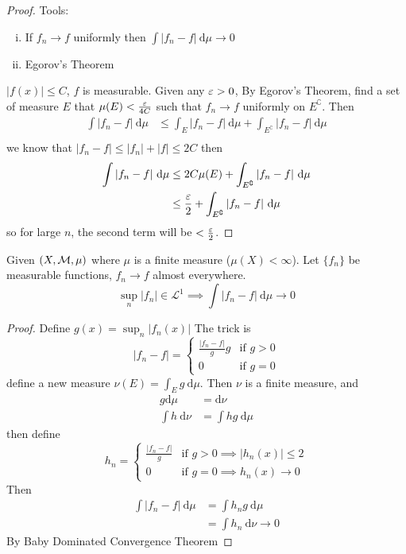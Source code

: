 \begin{proof}
  Tools:
  \begin{enumerate}[(i)]
    \item If $f_n \to f$ uniformly then $\int |f_n-f| \ \mathrm{d}\mu \to 0$
    \item Egorov's Theorem
  \end{enumerate}
  $|f(x)| \le C$, $f$ is measurable.
  Given any $\varepsilon > 0$, By Egorov's Theorem, find a set of measure $E$ that $\mu(E) < \frac{\varepsilon}{4C}$ 
  such that $f_n \to f$ uniformly on $E^\complement$.
  Then
  \begin{align*}
    \int |f_n - f| \ \mathrm{d}\mu &\le \int_E |f_n - f| \ \mathrm{d}\mu + \int_{E^\complement} |f_n - f| \ \mathrm{d}\mu  \\
  \end{align*}
  we know that $|f_n - f| \le |f_n| + |f| \le 2C$ then
  \begin{align*}
    \int |f_n - f| \ \mathrm{d}\mu &\le 2C\mu(E) + \int_{E^\complement} |f_n - f| \ \mathrm{d}\mu  \\
    &\le \frac{\eps}{2} + \int_{E^\complement} |f_n - f| \ \mathrm{d}\mu  \\ 
  \end{align*}
  so for large $n$, the second term will be $< \frac{\varepsilon}{2}$.
\end{proof}

\begin{theorem}
  Given $(X, \mathcal M, \mu)$ where $\mu$ is a finite measure ($\mu(X) < \infty$).
  Let $\{f_n\}$ be measurable functions, $f_n \to f$ almost everywhere.
  \[\sup_n|f_n| \in \mathcal{L}^1 \implies \int |f_n - f| \ \mathrm{d}\mu \to 0\]
\end{theorem}

\begin{proof}
  Define $g(x) = \sup_n |f_n(x)|$ 
  The trick is $$|f_n - f| =\begin{cases}
     \frac{|f_n-f|}{g}g & \text{if } g > 0 \\
     0 & \text{if } g = 0
  \end{cases}$$
  define a new measure $\nu(E) = \int_E g \ \mathrm{d}\mu$.
  Then $\nu$ is a finite measure, and 
  \begin{align*}
    g \mathrm{d}\mu &= \mathrm{d}\nu \\
    \int h \ \mathrm{d}\nu &= \int hg \ \mathrm{d}\mu
  \end{align*}
  then define
  $$h_n = \begin{cases}
    \frac{|f_n - f|}{g} & \text{if } g > 0 \implies |h_n(x)| \le 2\\
    0 & \text{if } g = 0 \implies h_n(x) \to 0
  \end{cases}$$
  Then\begin{align*}
    \int |f_n - f| \ \mathrm{d}\mu &= \int h_n g \ \mathrm{d}\mu \\
    &= \int h_n \ \mathrm{d}\nu \to 0
  \end{align*}
  By Baby Dominated Convergence Theorem
\end{proof}

